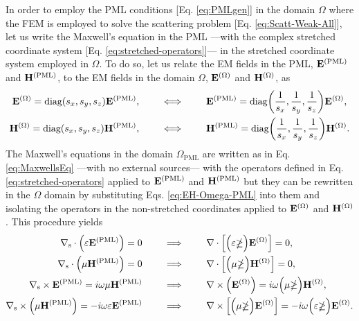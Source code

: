    In order to employ the PML conditions [Eq. \eqref{eq:PMLgen}] in the domain $\Omega$ where the FEM is employed to solve the scattering problem [Eq. \eqref{eq:Scatt-Weak-All}], let us write the Maxwell's equation in the PML ---with the complex stretched coordinate system [Eq. \eqref{eq:stretched-operators}]--- in the stretched coordinate system employed in $\Omega$. To do so, let us relate the EM fields in the PML, $\vb{E}^\text{(PML)}$ and $\vb{H}^\text{(PML)}$, to the EM fields in the domain $\Omega$, $\vb{E}^{(\Omega)}$ and $\vb{H}^{(\Omega)}$,  as \cite{jin_theory_2010}
   \begin{subequations}
       \label{eq:EH-Omega-PML}
   \begin{align}
        \vb{E}^{(\Omega)} = \text{diag}(s_x,s_y,s_z)\vb{E}^\text{(PML)},
            \qquad
            &\iff
            \qquad
         \vb{E}^\text{(PML)} = \text{diag}\qty(\frac{1}{s_x},\frac{1}{s_y},\frac{1}{s_z})\vb{E}^{(\Omega)},
       \label{eq:E-Omega-PML}
    \\
       \vb{H}^{(\Omega)} = \text{diag}(s_x,s_y,s_z)\vb{H}^\text{(PML)},
            \qquad
             &\iff
            \qquad
       \vb{H}^\text{(PML)} = \text{diag}\qty(\frac{1}{s_x},\frac{1}{s_y},\frac{1}{s_z})\vb{H}^{(\Omega)}.
       \label{eq:E-Omega-PML}
   \end{align}
    \end{subequations}
    The Maxwell's equations in the domain $\Omega_\text{PML}$ are written as in Eq. \eqref{eq:MaxwellsEq} ---with no external sources--- with the operators defined in Eq. \eqref{eq:stretched-operators} applied to $\vb{E}^\text{(PML)}$ and $\vb{H}^\text{(PML)}$ but they can be rewritten in the $\Omega$ domain by substituting  Eqs. \eqref{eq:EH-Omega-PML} into them and isolating the operators in the non-stretched coordinates applied to $\vb{E}^{(\Omega)}$ and $\vb{H}^{(\Omega)}$. This procedure yields \cite{jin_theory_2010}
    \begin{subequations}
        \label{eq:MaxwellsEq-PML}
    \begin{align}
        \nabla_\text{s} \cdot \qty(\varepsilon \vb{E}^\text{(PML)})  = 0
            \qquad &\implies\qquad
            \nabla \cdot \Big[\Big(\varepsilon \mathbb{\Lambda}\Big)\vb{E}^{(\Omega)}\Big] =  0,
             \\
        \nabla_\text{s}  \cdot    \Big(\mu \vb{H}^\text{(PML)}\Big) = 0
            \qquad &\implies\qquad
            \nabla \cdot \Big[\Big(\mu \mathbb{\Lambda} \Big)\vb{H}^{(\Omega)}\Big] =  0,
            \\
        \nabla_\text{s} \times \vb{E}^\text{(PML)}  = i\omega \mu \vb{H}^\text{(PML)}
            \qquad &\implies\qquad
            \nabla \times \Big(\vb{E}^{(\Omega)}\Big) = i\omega\Big( \mu\mathbb{\Lambda}\Big) \vb{H}^{(\Omega)},
            \\
        \nabla_\text{s}  \times\Big(\mu \vb{H}^\text{(PML)} \Big) =   - i\omega \varepsilon \vb{E}^\text{(PML)}
            \qquad &\implies\qquad
            \nabla \times \Big[\Big(\mu \mathbb{\Lambda}\Big) \vb{E}^{(\Omega)}\Big] =  -i\omega\Big(\varepsilon\mathbb{\Lambda}\Big)\vb{E}^{(\Omega)}.
    \end{align}
    \end{subequations}

